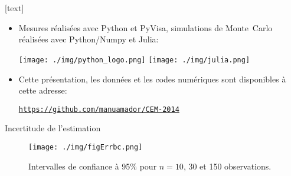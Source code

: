 \documentclass[]{beamer}
\begin{document}
\section{}
\begin{frame}{}
[text]

\small

\vspace{0.3cm}

\begin{itemize}
\item Mesures réalisées avec Python et PyVisa, simulations de Monte~Carlo réalisées avec Python/Numpy et Julia:\\[0.2cm]
\centerline{\texttt{[image: ./img/python\_logo.png]}
\hspace{1cm}\texttt{[image: ./img/julia.png]}}
\item Cette présentation, les données et les codes numériques sont disponibles à cette adresse:\\[0.2cm]
\centerline{\href{https://github.com/manuamador/CEM-2014}{{\texttt{https://github.com/manuamador/CEM-2014}}}}
\end{itemize}
\end{frame}

\begin{frame}{Incertitude de l'estimation}
\vspace{0cm}
\begin{figure}
\centering
\texttt{[image: ./img/figErrbc.png]}
\vspace{-0.3cm}
\caption{Intervalles de confiance à 95\% pour $n=10$, 30 et 150 observations.}
\end{figure}
\end{frame}
\end{document}
